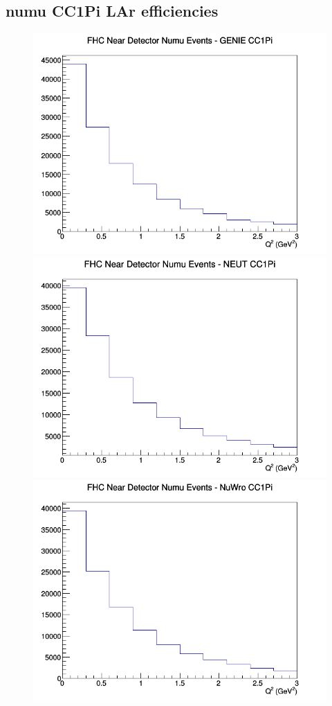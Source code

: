 \subsection{numu CC1Pi LAr efficiencies}
\begin{figure}[h]
\includegraphics[width=\linewidth]{eff_Q2/LAr/CC1Pi_FHC_ND_numu_Q2_GENIE.png}
\endminipage
{}
\includegraphics[width=\linewidth]{eff_Q2/LAr/CC1Pi_FHC_ND_numu_Q2_NEUT.png}
\endminipage
{}
\includegraphics[width=\linewidth]{eff_Q2/LAr/CC1Pi_FHC_ND_numu_Q2_NuWro.png}

\end{figure}
